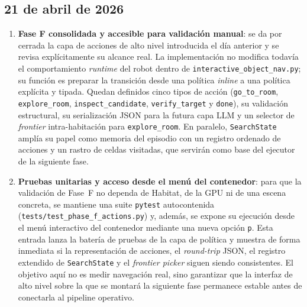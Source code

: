 \documentclass[11pt,a4paper]{article}
\begin{document}
\subsection*{21 de abril de 2026}

\begin{enumerate}

  \item \textbf{Fase F consolidada y accesible para validación manual}: se da
        por cerrada la capa de acciones de alto nivel introducida el día
        anterior y se revisa explícitamente su alcance real. La implementación
        no modifica todavía el comportamiento \emph{runtime} del robot dentro
        de \texttt{interactive\_object\_nav.py}; su función es preparar la
        transición desde una política \emph{inline} a una política explícita y
        tipada. Quedan definidos cinco tipos de acción
        (\texttt{go\_to\_room}, \texttt{explore\_room},
        \texttt{inspect\_candidate}, \texttt{verify\_target} y
        \texttt{done}), su validación estructural, su serialización JSON para
        la futura capa LLM y un selector de \emph{frontier} intra-habitación
        para \texttt{explore\_room}. En paralelo, \texttt{SearchState} amplía
        su papel como memoria del episodio con un registro ordenado de acciones
        y un rastro de celdas visitadas, que servirán como base del ejecutor de
        la siguiente fase.

  \item \textbf{Pruebas unitarias y acceso desde el menú del contenedor}: para
        que la validación de Fase~F no dependa de Habitat, de la GPU ni de una
        escena concreta, se mantiene una suite \texttt{pytest} autocontenida
        (\texttt{tests/test\_phase\_f\_actions.py}) y, además, se expone su
        ejecución desde el menú interactivo del contenedor mediante una nueva
        opción \texttt{p}. Esta entrada lanza la batería de pruebas de la capa
        de política y muestra de forma inmediata si la representación de
        acciones, el \textit{round-trip} JSON, el registro extendido de
        \texttt{SearchState} y el \textit{frontier picker} siguen siendo
        consistentes. El objetivo aquí no es medir navegación real, sino
        garantizar que la interfaz de alto nivel sobre la que se montará la
        siguiente fase permanece estable antes de conectarla al pipeline
        operativo.


\end{enumerate}
\end{document}
